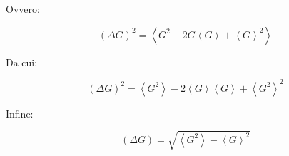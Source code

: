 Ovvero:

	\begin{equation}
		(\Delta G)^2 = \left \langle G^2 - 2 G \left \langle G \right \rangle + \left \langle G \right \rangle ^2 \right \rangle
	\end{equation}

Da cui:

	\begin{equation}
		(\Delta G)^2 = \left \langle G^2 \right \rangle - 2 \left \langle G \right \rangle \left \langle G \right \rangle + \left \langle G^2 \right \rangle^2
	\end{equation}

Infine:

	\begin{equation}
		(\Delta G) = \sqrt{ \left \langle G^2 \right \rangle - \left \langle G \right \rangle ^ 2 }
	\end{equation}
